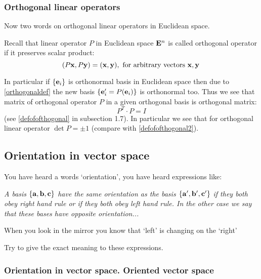 \documentclass[12pt]{article}
\numberwithin{equation}{section}
\begin{document}

 \subsubsection {Orthogonal linear operators}\label{orthogonaloperator}

   Now two words on 
orthogonal linear operators in Euclidean space.



    Recall that linear operator $P$ in Euclidean space ${\bf E}^n$
is called orthogonal operator if it preserves scalar product:
        \begin{equation}\label{orthogonaldef}
        (P{\bf x}, P{\bf y})=({\bf x},{\bf y}), \hbox{ for arbitrary vectors ${\bf x},{\bf y}$}\,
          \end{equation}

In particular if $\{{\bf e}_i\}$ is orthonormal basis in Euclidean space then
due to \eqref{orthogonaldef} the new basis $\{{\bf e}'_i=P({\bf e}_i)\}$ is orthonormal too. Thus we see that matrix of orthogonal operator $P$ in a given orthogonal
basis is orthogonal matrix:
         \begin{equation}\label{orthogonallinearoperator}
                   P^T\cdot P=I
                   \end{equation}
 (see \eqref{defofofthogonal} in subsection 1.7).
   In particular we see that for orthogonal linear operator
     $\det P=\pm 1$ (compare with \eqref{defofofthogonal2}).

  

\subsection {Orientation in vector space}

    You have heard  a words `orientation', you have heard expressions like: 

{\it A basis  $\{{\bf a},{\bf b},{\bf c}\}$ have the same orientation as 
the basis $\{{\bf a}',{\bf b}',{\bf c}'\}$
     if they both obey right hand rule or if they both obey left hand rule.
     In the other case we say that these 
bases have opposite orientation...}


   When you look in the mirror you know that
 `left' is changing on the `right'

    Try to give the exact meaning to these expressions.

\subsubsection{Orientation in vector space. Oriented vector space}
\end{document}
